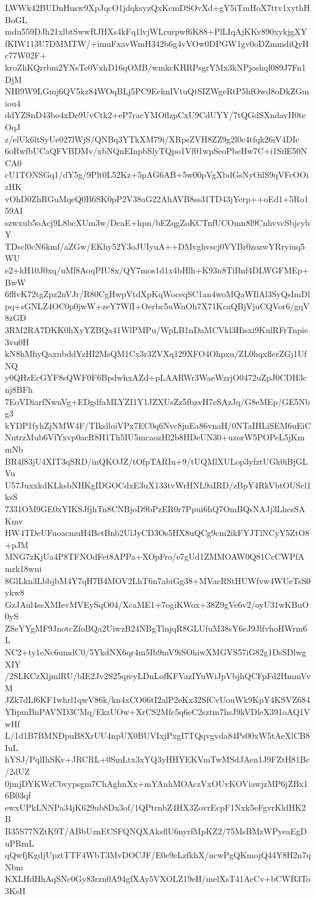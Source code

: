 LWWk42BUDnHusw9XpJqcO1jdqksyzQxKcmDSOvXd+gY5iTmHoX7ttv1xythHBoGL
mdu559DJh21xlbtSwwRJHXs4kFq1lvjWLrurpwf6K88+PlLIqAjKKv890xykjgXY
fKIW113U7DMMTW/+imuFxavWmH342b6g4vVOw0DPGW1gv0oDZmmdiQyHc77W02F+
kroZhKQrrbm2YNsTc0VxhD16qOMB/wmkcKHRPsgrYMx3kNPjoshql089J7Fn1DjM
NHl9W9LGmj6QV5kz84WOqBLj5PC9EeknIVtuQtSIZWgeRtP5hfOwd8oDkZGmiou4
ddYZSnD43bo4xDe9UvCtk2+eP7racYMOflzpCxU9CdUYY/7tQGdSXndavH0teOqJ
z/elUk6ltSyUe027lWjS/QNBq3YTkXM79i/XRpsZVH8ZZ9g2l0c4tfqk26iV4DIc
6oRwfbUCaQFVBDMv/xbNQnEInpbSlyTQpo1Vf01wpSeoPbeHw7C+i1SilE50NCA0
cU1TONSGq1/dY5g/9Plt0L52Kz+5pAG6AB+5w00pVgXbdGsNyOilS9qVFcOOizHK
vOhD0ZhRGuMqeQ0B6SK0pP2V38aG22AhAVB8ss31TD43jYerp++oEd1+5Ro159AI
szwxub5oAcj9L8bcXUm3w/DeaE+hpn/bEZqgZoKCTnfUCOmn8l9CnhvvcSbjcybY
TDscl0cN6kmf/aZGw/EKhy52Y3oJUIyuA++DMvghvscj0VYBr0zozwYRryiuq5WU
e2+kH10J0xq/uMl8AoqPIU8x/QY7mos1d1x4bHlh+K93n8TiBnf4DLWGFMEp+BwW
6fflvK72tgZpz2nVJr/R80CgHwpVtdXpKqWoceqSC1an4woMQaWIlAl3SyQsImDl
pq+sGNLZ4OC0p0jwW+zeY7WfI+Oerbc5uWnOh7X71KcaQBjVjuCQVor6/gqV8zGD
3RM2RA7DKK0hXyYZBQa41WlPMPu/WpLB1nDaMCVkl3Hisxi9KulRFrTnpie3vu0H
kN8hMhyQaxubddYzHI2MsQM1Cx3r3ZVXq129XFO4Ohpxu/ZL0hqxflerZGj1UfNQ
y0QHzEcGYF8sQWF0F6BpdwhxAZd+pLAARWr3WaeWzrjO0472uZpJ0CDH3cnj8BFh
7EoVDiarfNwnVg+EDgdfaMLYZI1Y1JZXUsZz5fbzvH7eSAzJq/G8eMEp/GE5Nbg3
kYDP1fyhZjNMW4F/TIkslloiVPx7EC0q6Nvc8jnEa86vnaH/0NTaIHLiSEM6uEiC
NntrzMub6VfYxvp0acR8H1Th5IU5mcaozHl2b8HDeUN30+uzorW5POPeL5jKmmNb
BR4f83jU4XIT3qSRD/inQKOJZ/tOfpTARIu+9/tUQMlXULop3yfztUGk0iBjGLVu
U57JuxxkdKLksbNHKgIDGOCdxE3uX133tvWrHNL9aIRD/zBpY4RkVbtOUScl1ksS
7331OM9GE0xYIKSJfjhTn8CNBjoD9bPzER0r7Ppui6hQ7OmBQsNAJj3LhcsSAKmv
HW4TDeUFuoacmuH4BctBnb2UlJyCD3Os5HX8uQCg9cm2ikFYJTlNCyY5ZtO8+pJM
MNG7zKjUa4P8TFNOdFet8APPa+XOpFro/e7gUd1ZMMOAW0Q81CcCWPfAmrk18wni
8GlLkn3LbbjbM4Y7qH7B4MOV2LhT6n7abiGg38+MVaeRStHUWfvw4WUeTsS0ykw8
GzJAul4ssXMIevMVEySqO04/XcaME1+7ogiKWox+38Z9gVe6v2/oyU31wKBuO0yS
ZSeYYgMF9JnotcZfoBQa2UiwzB24NBgTlnjqR8GLUfuM38sY6eJ9JlfvhoHWrm6L
NC2+ty1eNc6umdC0/5YkdNX6qr4m5Ib9mV9iSOhiwXMGVS57iG82g1DsSDlwgXIY
/2SLKCzXljmlRU/bIE2Jv2S25qreyLDnLofKFVazIYuWiJpVbjhQCFpFd2HmmVvM
JZk7dLf6KF1whrl1qwV86k/kn4xCO06tI2alP2eKx32SfCvUouWk9KpY4KSVZ684
YIipmBnPAVND3CMq/EkzUOw+XrCS2Mfc5q6eC2sztm7hsJ9kVDleX391oAQ1VwHf
L/1d1B7BMNDpuB8XrUU4npUX0BUVIxjPxgI7TQqvgvda84Ps00xW5tAeXlCB8IuL
hYSJ/PqlIhSKv+JRCRL+0SmLtx3xYQ3yHHYEKVmTwMSdJAen1J9FZtH81Bc/2dUZ
0jmjDYKWzCbvypsgm7ChAghnXx+mYAnhMOAczVxOUvKOViawjzMP6jZBx16B03qf
ewxUPkLNNPa34jK629ub8Dx3of/1QPtrnbZ4HX3ZovrEcpF1Nxk5eFgvrKldHK2B
B35S77NZtK9T/ABbUznECSFQNQXAksflU6nyrfMpKZ2/75MsBMzWPyeaEgDuPRmL
qQwfjKgdjUpztTTF4WbT3MvDOCJF/E0e9eLzfkhX/ncwPgQKmojQ44Y8H2n7qNbm
KXLHdHhAqSNc0Gy83rzn0A94gfXAy5VXOLZ19eH/melXsT41AeCv+bCWB3To3KsH
